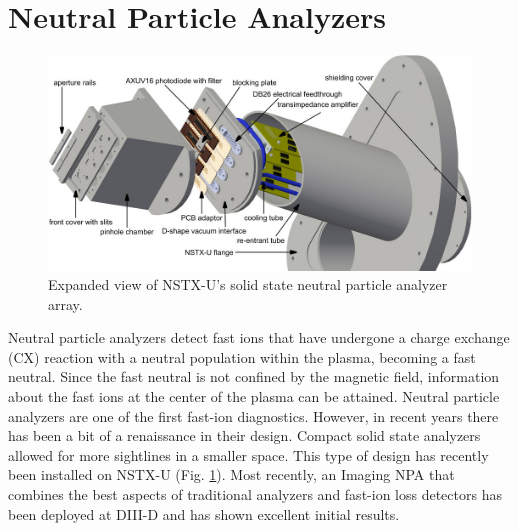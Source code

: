 \section{Neutral Particle Analyzers}
\begin{figure}[ht]
    \centering
    \includegraphics[width=12cm]{figures/nstx_npa.jpeg}
    \caption{Expanded view of NSTX-U's solid state neutral particle analyzer array.\cite{liu2014design}}
    \label{fig:npa}
\end{figure}
Neutral particle analyzers detect fast ions that have undergone a charge exchange (CX) reaction with a neutral population within the plasma, becoming a fast neutral. Since the fast neutral is not confined by the magnetic field, information about the fast ions at the center of the plasma can be attained. Neutral particle analyzers are one of the first fast-ion diagnostics\cite{artsimovich1969experiments}. However, in recent years there has been a bit of a renaissance in their design. Compact solid state analyzers\cite{zhu2012compact} allowed for more sightlines in a smaller space. This type of design has recently been installed on NSTX-U (Fig. \ref{fig:npa}). Most recently, an Imaging NPA that combines the best aspects of traditional analyzers and fast-ion loss detectors has been deployed at DIII-D and has shown excellent initial results\cite{du2018inpa}.


